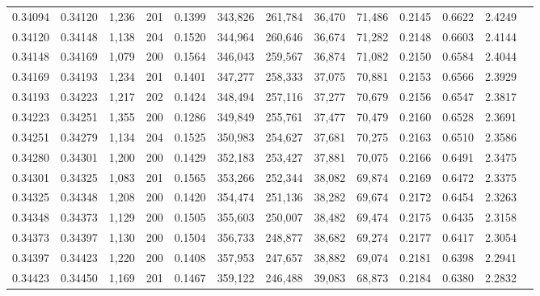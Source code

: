 \begin{tabular}{rrrrrrrrrrrrr}
0.34094 & 0.34120 & 1,236 & 201 &                                     0.1399 & 343,826 & 261,784 &  36,470 &  71,486 & 0.2145 & 0.6622 & 2.4249 \\
0.34120 & 0.34148 & 1,138 & 204 &                                     0.1520 & 344,964 & 260,646 &  36,674 &  71,282 & 0.2148 & 0.6603 & 2.4144 \\
0.34148 & 0.34169 & 1,079 & 200 &                                     0.1564 & 346,043 & 259,567 &  36,874 &  71,082 & 0.2150 & 0.6584 & 2.4044 \\
0.34169 & 0.34193 & 1,234 & 201 &                                     0.1401 & 347,277 & 258,333 &  37,075 &  70,881 & 0.2153 & 0.6566 & 2.3929 \\
0.34193 & 0.34223 & 1,217 & 202 &                                     0.1424 & 348,494 & 257,116 &  37,277 &  70,679 & 0.2156 & 0.6547 & 2.3817 \\
0.34223 & 0.34251 & 1,355 & 200 &                                     0.1286 & 349,849 & 255,761 &  37,477 &  70,479 & 0.2160 & 0.6528 & 2.3691 \\
0.34251 & 0.34279 & 1,134 & 204 &                                     0.1525 & 350,983 & 254,627 &  37,681 &  70,275 & 0.2163 & 0.6510 & 2.3586 \\
0.34280 & 0.34301 & 1,200 & 200 &                                     0.1429 & 352,183 & 253,427 &  37,881 &  70,075 & 0.2166 & 0.6491 & 2.3475 \\
0.34301 & 0.34325 & 1,083 & 201 &                                     0.1565 & 353,266 & 252,344 &  38,082 &  69,874 & 0.2169 & 0.6472 & 2.3375 \\
0.34325 & 0.34348 & 1,208 & 200 &                                     0.1420 & 354,474 & 251,136 &  38,282 &  69,674 & 0.2172 & 0.6454 & 2.3263 \\
0.34348 & 0.34373 & 1,129 & 200 &                                     0.1505 & 355,603 & 250,007 &  38,482 &  69,474 & 0.2175 & 0.6435 & 2.3158 \\
0.34373 & 0.34397 & 1,130 & 200 &                                     0.1504 & 356,733 & 248,877 &  38,682 &  69,274 & 0.2177 & 0.6417 & 2.3054 \\
0.34397 & 0.34423 & 1,220 & 200 &                                     0.1408 & 357,953 & 247,657 &  38,882 &  69,074 & 0.2181 & 0.6398 & 2.2941 \\
0.34423 & 0.34450 & 1,169 & 201 &                                     0.1467 & 359,122 & 246,488 &  39,083 &  68,873 & 0.2184 & 0.6380 & 2.2832 \\

\end{tabular}
